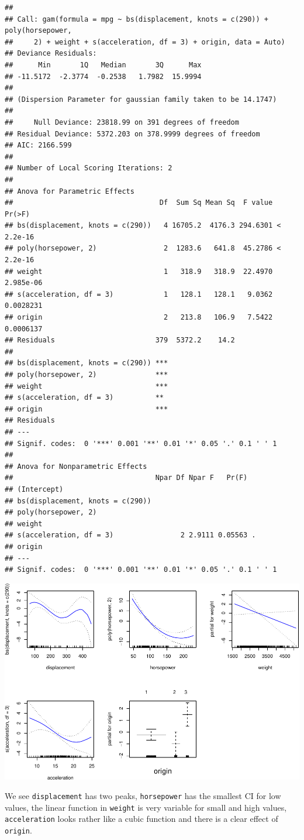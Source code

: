 \documentclass[]{article}
\begin{document}
\begin{verbatim}
## 
## Call: gam(formula = mpg ~ bs(displacement, knots = c(290)) + poly(horsepower, 
##     2) + weight + s(acceleration, df = 3) + origin, data = Auto)
## Deviance Residuals:
##      Min       1Q   Median       3Q      Max 
## -11.5172  -2.3774  -0.2538   1.7982  15.9994 
## 
## (Dispersion Parameter for gaussian family taken to be 14.1747)
## 
##     Null Deviance: 23818.99 on 391 degrees of freedom
## Residual Deviance: 5372.203 on 378.9999 degrees of freedom
## AIC: 2166.599 
## 
## Number of Local Scoring Iterations: 2 
## 
## Anova for Parametric Effects
##                                   Df  Sum Sq Mean Sq  F value    Pr(>F)
## bs(displacement, knots = c(290))   4 16705.2  4176.3 294.6301 < 2.2e-16
## poly(horsepower, 2)                2  1283.6   641.8  45.2786 < 2.2e-16
## weight                             1   318.9   318.9  22.4970 2.985e-06
## s(acceleration, df = 3)            1   128.1   128.1   9.0362 0.0028231
## origin                             2   213.8   106.9   7.5422 0.0006137
## Residuals                        379  5372.2    14.2                   
##                                     
## bs(displacement, knots = c(290)) ***
## poly(horsepower, 2)              ***
## weight                           ***
## s(acceleration, df = 3)          ** 
## origin                           ***
## Residuals                           
## ---
## Signif. codes:  0 '***' 0.001 '**' 0.01 '*' 0.05 '.' 0.1 ' ' 1
## 
## Anova for Nonparametric Effects
##                                  Npar Df Npar F   Pr(F)  
## (Intercept)                                              
## bs(displacement, knots = c(290))                         
## poly(horsepower, 2)                                      
## weight                                                   
## s(acceleration, df = 3)                2 2.9111 0.05563 .
## origin                                                   
## ---
## Signif. codes:  0 '***' 0.001 '**' 0.01 '*' 0.05 '.' 0.1 ' ' 1
\end{verbatim}

\includegraphics{RecEx7-sol_files/figure-latex/unnamed-chunk-7-1.pdf}

We see \texttt{displacement} has two peaks, \texttt{horsepower} has the
smallest CI for low values, the linear function in \texttt{weight} is
very variable for small and high values, \texttt{acceleration} looks
rather like a cubic function and there is a clear effect of
\texttt{origin}.
\end{document}
